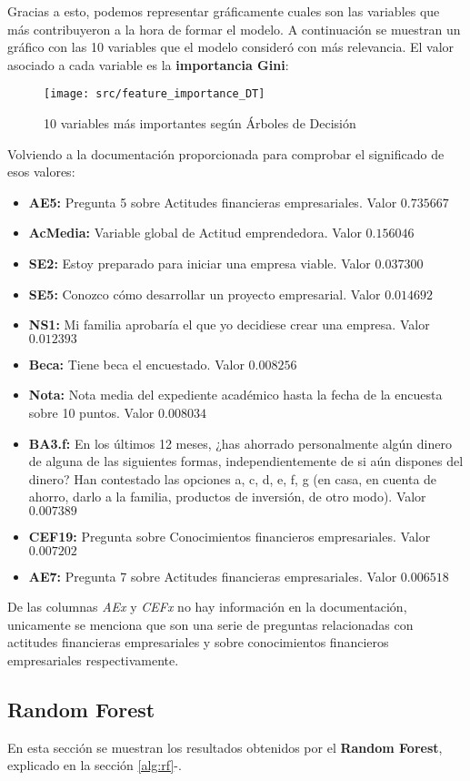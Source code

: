 Gracias a esto, podemos representar gráficamente cuales son las variables que más contribuyeron a la hora de formar el modelo. A continuación se muestran un gráfico con las 10 variables que el modelo consideró con más relevancia. El valor asociado a cada variable es la \textbf{importancia Gini}:
\begin{figure}[H]
	\centering
	\texttt{[image: src/feature\_importance\_DT]}
	\caption{10 variables más importantes según Árboles de Decisión}
	\label{fig:feature_dtree}
\end{figure}
Volviendo a la documentación proporcionada para comprobar el significado de esos valores:
\begin{itemize}
	\item \textbf{AE5:} Pregunta 5 sobre Actitudes financieras empresariales. Valor $0.735667$
	\item \textbf{AcMedia:} Variable global de Actitud emprendedora. Valor $0.156046$
	\item \textbf{SE2:} Estoy preparado para iniciar una empresa viable. Valor $0.037300$
	\item \textbf{SE5:} Conozco cómo desarrollar un proyecto empresarial. Valor $0.014692$
	\item \textbf{NS1:} Mi familia aprobaría el que yo decidiese crear una empresa. Valor $0.012393$
	\item \textbf{Beca:} Tiene beca el encuestado. Valor $0.008256$
	\item \textbf{Nota:} Nota media del expediente académico hasta la fecha de la encuesta sobre 10 puntos. Valor $0.008034$
	\item \textbf{BA3.f:} En los últimos 12 meses, ¿has ahorrado personalmente algún dinero de alguna de las siguientes formas, independientemente de si aún dispones del dinero? Han contestado las opciones a, c, d, e, f, g (en casa, en cuenta de ahorro, darlo a la familia, productos de inversión, de otro modo). Valor $0.007389$
	\item \textbf{CEF19:} Pregunta sobre Conocimientos financieros empresariales. Valor $0.007202$
	\item \textbf{AE7:} Pregunta 7 sobre Actitudes financieras empresariales. Valor $0.006518$
\end{itemize}
De las columnas \textit{AEx} y \textit{CEFx} no hay información en la documentación, unicamente se menciona que son una serie de preguntas relacionadas con actitudes financieras empresariales y sobre conocimientos financieros empresariales respectivamente.
\pagebreak
\subsection{Random Forest}
En esta sección se muestran los resultados obtenidos por el \textbf{Random Forest}, explicado en la sección \ref{alg:rf}-.
